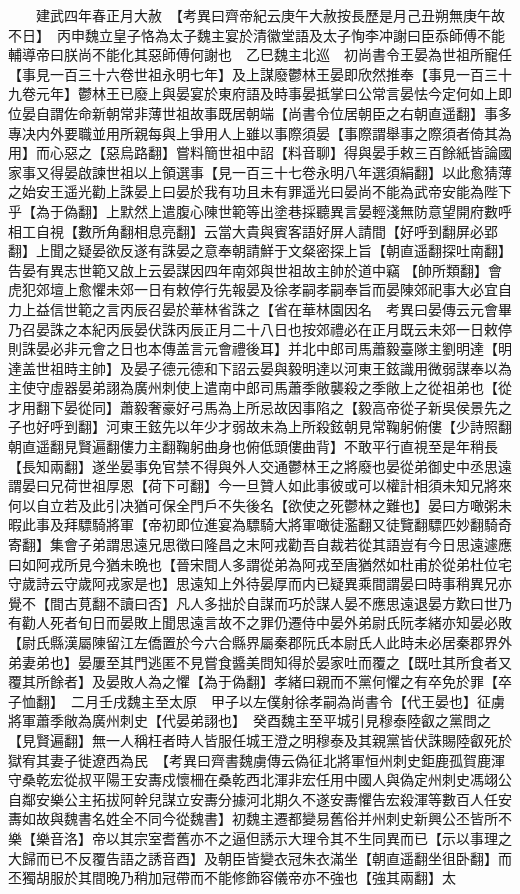　　建武四年春正月大赦　【考異曰齊帝紀云庚午大赦按長歷是月己丑朔無庚午故不日】　丙申魏立皇子恪為太子魏主宴於清徽堂語及太子恂李冲謝曰臣忝師傅不能輔導帝曰朕尚不能化其惡師傅何謝也　乙巳魏主北巡　初尚書令王晏為世祖所寵任【事見一百三十六卷世祖永明七年】及上謀廢鬱林王晏即欣然推奉【事見一百三十九卷元年】鬱林王已廢上與晏宴於東府語及時事晏抵掌曰公常言晏怯今定何如上即位晏自謂佐命新朝常非薄世祖故事既居朝端【尚書令位居朝臣之右朝直遥翻】事多專决内外要職並用所親每與上爭用人上雖以事際須晏【事際謂舉事之際須者倚其為用】而心惡之【惡烏路翻】嘗料簡世祖中詔【料音聊】得與晏手敕三百餘紙皆論國家事又得晏啟諫世祖以上領選事【見一百三十七卷永明八年選須絹翻】以此愈猜薄之始安王遥光勸上誅晏上曰晏於我有功且未有罪遥光曰晏尚不能為武帝安能為陛下乎【為于偽翻】上默然上遣腹心陳世範等出塗巷採聽異言晏輕淺無防意望開府數呼相工自視【數所角翻相息亮翻】云當大貴與賓客語好屏人請間【好呼到翻屏必郢翻】上聞之疑晏欲反遂有誅晏之意奉朝請鮮于文粲密探上旨【朝直遥翻探吐南翻】告晏有異志世範又啟上云晏謀因四年南郊與世祖故主帥於道中竊【帥所類翻】會虎犯郊壇上愈懼未郊一日有敕停行先報晏及徐孝嗣孝嗣奉旨而晏陳郊祀事大必宜自力上益信世範之言丙辰召晏於華林省誅之【省在華林園因名　考異曰晏傳云元會畢乃召晏誅之本紀丙辰晏伏誅丙辰正月二十八日也按郊禮必在正月既云未郊一日敕停則誅晏必非元會之日也本傳盖言元會禮後耳】并北中郎司馬蕭毅臺隊主劉明達【明達盖世祖時主帥】及晏子德元德和下詔云晏與毅明達以河東王鉉識用微弱謀奉以為主使守虛器晏弟詡為廣州刺使上遣南中郎司馬蕭季敞襲殺之季敞上之從祖弟也【從才用翻下晏從同】蕭毅奢豪好弓馬為上所忌故因事陷之【毅高帝從子新吳侯景先之子也好呼到翻】河東王鉉先以年少才弱故未為上所殺鉉朝見常鞠躬俯僂【少詩照翻朝直遥翻見賢遍翻僂力主翻鞠躬曲身也俯低頭僂曲背】不敢平行直視至是年稍長【長知兩翻】遂坐晏事免官禁不得與外人交通鬱林王之將廢也晏從弟御史中丞思遠謂晏曰兄荷世祖厚恩【荷下可翻】今一旦贊人如此事彼或可以權計相須未知兄將來何以自立若及此引决猶可保全門戶不失後名【欲使之死鬱林之難也】晏曰方噉粥未暇此事及拜驃騎將軍【帝初即位進宴為驃騎大將軍噉徒濫翻又徒覽翻驃匹妙翻騎奇寄翻】集會子弟謂思遠兄思徵曰隆昌之末阿戎勸吾自裁若從其語豈有今日思遠遽應曰如阿戎所見今猶未晩也【晉宋間人多謂從弟為阿戎至唐猶然如杜甫於從弟杜位宅守歲詩云守歲阿戎家是也】思遠知上外待晏厚而内已疑異乘間謂晏曰時事稍異兄亦覺不【間古莧翻不讀曰否】凡人多拙於自謀而巧於謀人晏不應思遠退晏方歎曰世乃有勸人死者旬日而晏敗上聞思遠言故不之罪仍遷侍中晏外弟尉氏阮孝緒亦知晏必敗【尉氏縣漢屬陳留江左僑置於今六合縣界屬秦郡阮氏本尉氏人此時未必居秦郡界外弟妻弟也】晏屢至其門逃匿不見嘗食醬美問知得於晏家吐而覆之【既吐其所食者又覆其所餘者】及晏敗人為之懼【為于偽翻】孝緒曰親而不黨何懼之有卒免於罪【卒子恤翻】　二月壬戌魏主至太原　甲子以左僕射徐孝嗣為尚書令【代王晏也】征虜將軍蕭季敞為廣州刺史【代晏弟詡也】　癸酉魏主至平城引見穆泰陸叡之黨問之【見賢遍翻】無一人稱枉者時人皆服任城王澄之明穆泰及其親黨皆伏誅賜陸叡死於獄宥其妻子徙遼西為民　【考異曰齊書魏虜傳云偽征北將軍恒州刺史鉅鹿孤賀鹿渾守桑乾宏從叔平陽王安夀戍懷柵在桑乾西北渾非宏任用中國人與偽定州刺史馮翊公自鄰安樂公主拓拔阿幹兒謀立安夀分據河北期久不遂安夀懼告宏殺渾等數百人任安夀如故與魏書名姓全不同今從魏書】初魏主遷都變易舊俗并州刺史新興公丕皆所不樂【樂音洛】帝以其宗室耆舊亦不之逼但誘示大理令其不生同異而已【示以事理之大歸而已不反覆告語之誘音酉】及朝臣皆變衣冠朱衣滿坐【朝直遥翻坐徂卧翻】而丕獨胡服於其間晚乃稍加冠帶而不能修飾容儀帝亦不強也【強其兩翻】太